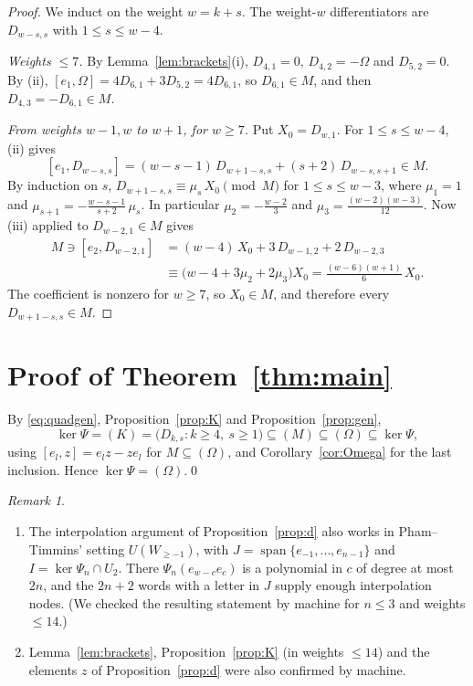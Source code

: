 \documentclass[11pt]{amsart}
\theoremstyle{definition}
\theoremstyle{remark}
\newtheorem{remark}[theorem]{Remark}
\newcommand{\U}{U}
\begin{document}
\begin{proof}
We induct on the weight $w=k+s$. The weight-$w$ differentiators are $D_{w-s,s}$ with $1\le s\le w-4$.

\emph{Weights $\le7$.} By Lemma~\ref{lem:brackets}(i), $D_{4,1}=0$, $D_{4,2}=-\Omega$ and $D_{5,2}=0$. By (ii), $[e_1,\Omega]=4D_{6,1}+3D_{5,2}=4D_{6,1}$, so $D_{6,1}\in M$, and then $D_{4,3}=-D_{6,1}\in M$.

\emph{From weights $w-1,w$ to $w+1$, for $w\ge7$.} Put $X_0=D_{w,1}$. For $1\le s\le w-4$, (ii) gives
\[
[e_1,D_{w-s,s}]=(w-s-1)\,D_{w+1-s,s}+(s+2)\,D_{w-s,s+1}\in M .
\]
By induction on $s$, $D_{w+1-s,s}\equiv\mu_s\,X_0\pmod M$ for $1\le s\le w-3$, where $\mu_1=1$ and $\mu_{s+1}=-\frac{w-s-1}{s+2}\,\mu_s$. In particular $\mu_2=-\frac{w-2}{3}$ and $\mu_3=\frac{(w-2)(w-3)}{12}$. Now (iii) applied to $D_{w-2,1}\in M$ gives
\begin{align*}
M\ni[e_2,D_{w-2,1}]&=(w-4)\,X_0+3\,D_{w-1,2}+2\,D_{w-2,3}\\
&\equiv\bigl(w-4+3\mu_2+2\mu_3\bigr)X_0=\frac{(w-6)(w+1)}{6}\,X_0 .
\end{align*}
The coefficient is nonzero for $w\ge7$, so $X_0\in M$, and therefore every $D_{w+1-s,s}\in M$.
\end{proof}

\section{Proof of Theorem~\ref{thm:main}}

By \eqref{eq:quadgen}, Proposition~\ref{prop:K} and Proposition~\ref{prop:gen},
\[
\ker\Psi=(K)=\bigl(D_{k,s}:k\ge4,\ s\ge1\bigr)\subseteq(M)\subseteq(\Omega)\subseteq\ker\Psi ,
\]
using $[e_l,z]=e_lz-ze_l$ for $M\subseteq(\Omega)$, and Corollary~\ref{cor:Omega} for the last inclusion. Hence $\ker\Psi=(\Omega)$.\qed

\begin{remark}\leavevmode
\begin{enumerate}[label=(\arabic*)]
\item The interpolation argument of Proposition~\ref{prop:d} also works in Pham--Timmins' setting $\U(W_{\ge-1})$, with $J=\operatorname{span}\{e_{-1},\dots,e_{n-1}\}$ and $I=\ker\Psi_n\cap\U_2$. There $\Psi_n(e_{w-c}e_c)$ is a polynomial in $c$ of degree at most $2n$, and the $2n+2$ words with a letter in $J$ supply enough interpolation nodes. (We checked the resulting statement by machine for $n\le3$ and weights $\le14$.)
\item Lemma~\ref{lem:brackets}, Proposition~\ref{prop:K} (in weights $\le14$) and the elements $z$ of Proposition~\ref{prop:d} were also confirmed by machine.
\end{enumerate}
\end{remark}
\end{document}
